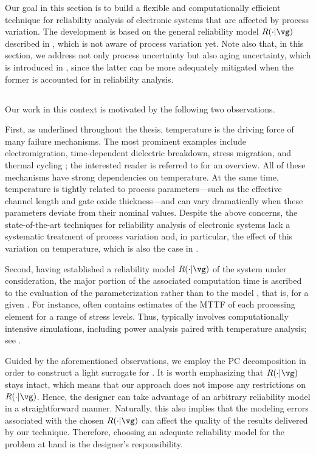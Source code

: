 Our goal in this section is to build a flexible and computationally efficient
technique for reliability analysis of electronic systems that are affected by
process variation. The development is based on the general reliability model
$R(\cdot | \vg)$ described in , which is not aware of
process variation yet. Note also that, in this section, we address not only
process uncertainty but also aging uncertainty, which is introduced in
, since the latter can be more adequately mitigated when
the former is accounted for in reliability analysis.

\subsection{\problemtitle}

Our work in this context is motivated by the following two observations.

First, as underlined throughout the thesis, temperature is the driving force of
many failure mechanisms. The most prominent examples include electromigration,
time-dependent dielectric breakdown, stress migration, and thermal cycling
\cite{xiang2010}; the interested reader is referred to \cite{jedec2016} for an
overview. All of these mechanisms have strong dependencies on temperature. At
the same time, temperature is tightly related to process parameters---such as
the effective channel length and gate oxide thickness---and can vary
dramatically when these parameters deviate from their nominal values. Despite
the above concerns, the state-of-the-art techniques for reliability analysis of
electronic systems lack a systematic treatment of process variation and, in
particular, the effect of this variation on temperature, which is also the case
in .

Second, having established a reliability model $R(\cdot | \vg)$ of the system
under consideration, the major portion of the associated computation time is
ascribed to the evaluation of the parameterization \vg rather than to the model
\perse, that is, for a given \vg. For instance, \vg often contains estimates of
the \ac{MTTF} of each processing element for a range of stress levels. Thus, \vg
typically involves computationally intensive simulations, including power
analysis paired with temperature analysis; see .

Guided by the aforementioned observations, we employ the \ac{PC} decomposition
in order to construct a light surrogate for \vg. It is worth emphasizing that
$R(\cdot | \vg)$ stays intact, which means that our approach does not impose any
restrictions on $R(\cdot | \vg)$. Hence, the designer can take advantage of an
arbitrary reliability model in a straightforward manner. Naturally, this also
implies that the modeling errors associated with the chosen $R(\cdot | \vg)$ can
affect the quality of the results delivered by our technique. Therefore,
choosing an adequate reliability model for the problem at hand is the designer's
responsibility.


